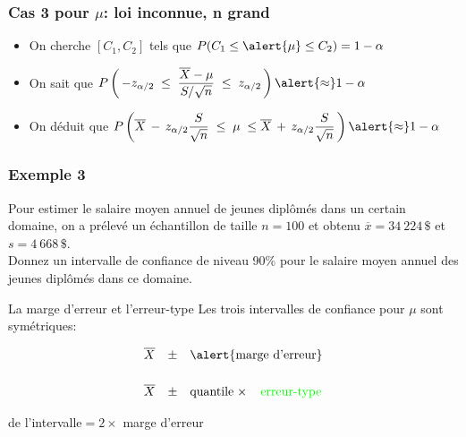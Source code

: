 \documentclass{BeamerTemplate}
\begin{document}
\begin{frame}[t]
 \frametitle{Cas 3 pour $\mu$: loi inconnue, n grand}

 \begin{itemize} \itemsep3mm
\item On cherche $[C_1, C_2]$ tels que $P(C_1\le \alert{\mu} \le C_2)=1-\alpha$
\item On sait que $P\left(\,-z_{\alpha/2 }\;\le \;\dfrac{\overline X - \mu}{S/\sqrt{n}}\;\le \;z_{\alpha/2 }\,\right)\alert{\approx} 1-\alpha$
    \vspace{7mm}
\item On déduit que $P\left(\overline X \,-\,z_{\alpha/2 } \dfrac{S}{\sqrt{n}}\;\le \;  \mu\;\le \overline X \,+\,z_{\alpha/2 }\dfrac{S}{\sqrt{n}}\,\right)\alert{\approx} 1-\alpha$
\end{itemize}
\end{frame}

\begin{frame}[t]
 \frametitle{Exemple 3}

 {\small
 Pour estimer le salaire moyen annuel de jeunes diplômés dans un certain domaine, on  a prélevé un échantillon de taille $n = 100$ et obtenu  $\overline{x}=34~224\,\$$ et $s=4~668\,\$$.\\

 Donnez un intervalle de confiance de niveau 90\% pour le salaire moyen annuel des  jeunes diplômés dans ce domaine.}



\end{frame}


\begin{frame}[t]{La marge d'erreur et l'erreur-type}
Les trois intervalles de confiance pour $\mu$ sont symétriques:

$$\begin{array}{cccc}
\overline X &\pm & \multicolumn{2}{c}{\alert{\text{marge d'erreur}}}\\[6mm]
\overline X &\pm & \text{quantile}\;\times&\text{\color{green}{erreur-type}}
\end{array}$$

\vspace{3cm}
{\color{blue}{Longueur}} de l'intervalle$ = 2\times $ marge d'erreur

\end{frame}
\end{document}
